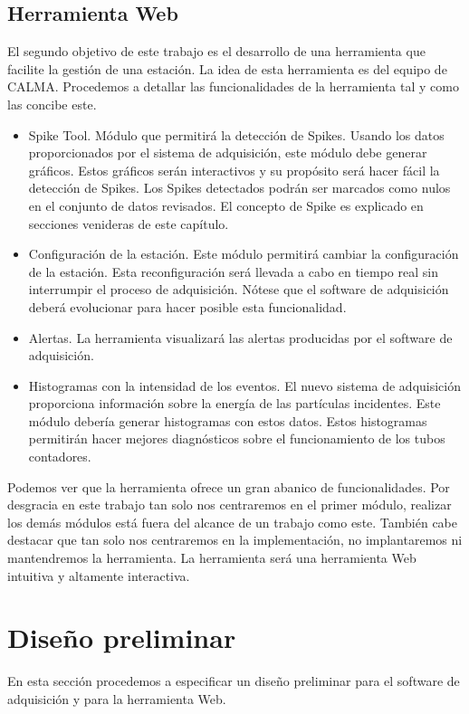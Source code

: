 	\subsection{Herramienta Web}
		El segundo objetivo de este trabajo es el desarrollo de una herramienta que facilite la gestión de una estación. La idea de esta
		herramienta es del equipo de CALMA. Procedemos a detallar las funcionalidades de la herramienta tal y como las concibe este.
		\begin{itemize}
			\item	Spike Tool. Módulo que permitirá la detección de Spikes. Usando los datos proporcionados por el sistema de
				adquisición, este módulo debe generar gráficos. Estos gráficos serán interactivos y su propósito será hacer fácil la
				detección de Spikes. Los Spikes detectados podrán ser marcados como nulos en el conjunto de datos revisados. El
				concepto de Spike es explicado en secciones venideras de este capítulo.
			\item 	Configuración de la estación. Este módulo permitirá cambiar la configuración de la estación. Esta reconfiguración será
				llevada a cabo en tiempo real sin interrumpir el proceso de adquisición. Nótese que el software de adquisición deberá
				evolucionar para hacer posible esta funcionalidad.
			\item	Alertas. La herramienta visualizará las alertas producidas por el software de adquisición.
			\item 	Histogramas con la intensidad de los eventos. El nuevo sistema de adquisición proporciona información sobre la energía
				de las partículas incidentes. Este módulo debería generar histogramas con estos datos. Estos histogramas permitirán
				hacer mejores diagnósticos sobre el funcionamiento de los tubos contadores. 
		\end{itemize}
		Podemos ver que la herramienta ofrece un gran abanico de funcionalidades. Por desgracia en este trabajo tan solo nos centraremos en el
		primer módulo, realizar los demás módulos está fuera del alcance de un trabajo como este. También cabe destacar que tan solo nos
		centraremos en la implementación, no implantaremos ni mantendremos la herramienta. La herramienta será una herramienta Web intuitiva y
		altamente interactiva.

\section{Diseño preliminar}
	En esta sección procedemos a especificar un diseño preliminar para el software de adquisición y para la herramienta Web.
